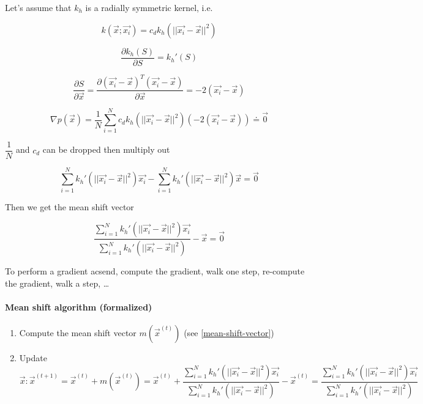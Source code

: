 Let's assume that $k_h$ is a radially symmetric kernel, i.e.\

\begin{equation*}
  k(\vec{x}; \vec{x_i}) = c_d k_h(||\vec{x_i} - \vec{x}||^2)
\end{equation*}

\begin{equation*}
  \dfrac{\partial k_h(S)}{\partial S} = k_h'(S)
\end{equation*}

\begin{equation*}
  \dfrac{\partial S}{\partial \vec{x}} = \dfrac{\partial{(\vec{x_i} - \vec{x})}^T (\vec{x_i} - \vec{x})}{\partial \vec{x}} = -2 (\vec{x_i} - \vec{x})
\end{equation*}

\begin{equation*}
  \nabla p(\vec{x}) = \dfrac{1}{N} \sum_{i=1}^N c_d k_h(||\vec{x_i} - \vec{x}||^2) (-2 (\vec{x_i} - \vec{x})) \doteq \vec{0}
\end{equation*}

$\dfrac{1}{N}$ and $c_d$ can be dropped then multiply out

\begin{equation*}
  \sum_{i=1}^N k_h'(||\vec{x_i} - \vec{x}||^2) \vec{x_i} - \sum_{i=1}^N k_h'(||\vec{x_i} - \vec{x}||^2) \vec{x} = \vec{0}
\end{equation*}

Then we get the mean shift vector

\begin{equation}
  \label{mean-shift-vector}
  \dfrac{\sum_{i=1}^N k_h'(||\vec{x_i} - \vec{x}||^2) \vec{x_i}}{\sum_{i=1}^N k_h'(||\vec{x_i} - \vec{x}||^2)} - \vec{x} = \vec{0}
\end{equation}

To perform a gradient acsend, compute the gradient, walk one step, re-compute the gradient, walk a step, \ldots

\paragraph{Mean shift algorithm (formalized)}
\begin{enumerate}
  \item Compute the mean shift vector $m(\vec{x}^{(t)})$ (see \ref{mean-shift-vector})
  \item Update $\vec{x}:\vec{x}^{(t+1)} = \vec{x}^{(t)} + m(\vec{x}^{(t)}) = \vec{x}^{(t)} + \dfrac{\sum_{i=1}^N k_h'(||\vec{x_i} - \vec{x}||^2) \vec{x_i}}{\sum_{i=1}^N k_h'(||\vec{x_i} - \vec{x}||^2)} - \vec{x}^{(t)}= \dfrac{\sum_{i=1}^N k_h'(||\vec{x_i} - \vec{x}||^2) \vec{x_i}}{\sum_{i=1}^N k_h'(||\vec{x_i} - \vec{x}||^2)}$
\end{enumerate}

